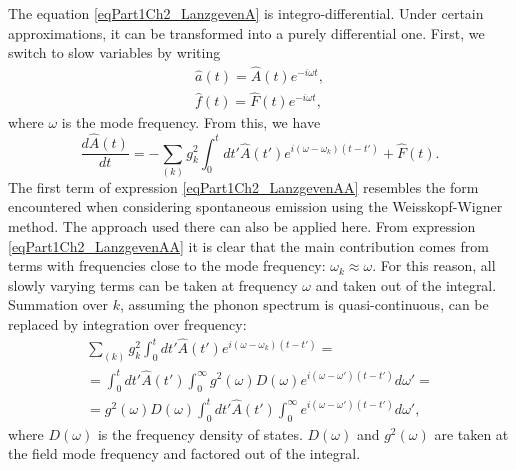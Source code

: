 The equation \eqref{eqPart1Ch2_LanzgevenA} is integro-differential. Under certain approximations, it can be transformed into a purely differential one. First, we switch to slow variables by writing
\begin{eqnarray}
\hat{a}\left(t\right) = \hat{A}\left(t\right)e^{-i \omega t},
\nonumber \\
\hat{f}\left(t\right) = \hat{F}\left(t\right)e^{-i \omega t},
\nonumber
\end{eqnarray}
where $\omega$ is the mode frequency. From this, we have
\begin{equation}
\frac{d \hat{A}\left(t\right)}{dt} = 
- \sum_{(k)} g_k^2 \int_0^t
d t'  \hat{A}\left(t'\right)e^{i \left(\omega -
  \omega_k\right)\left(t - t'\right)} 
+ \hat{F}\left(t\right).
\label{eqPart1Ch2_LanzgevenAA}
\end{equation}
The first term of expression \eqref{eqPart1Ch2_LanzgevenAA} resembles the form encountered when considering spontaneous emission using the Weisskopf-Wigner method. The approach used there can also be applied here. From expression \eqref{eqPart1Ch2_LanzgevenAA} it is clear that the main contribution comes from terms with frequencies close to the mode frequency: $\omega_k \approx \omega$. For this reason, all slowly varying terms can be taken at frequency $\omega$ and taken out of the integral. Summation over $k$, assuming the phonon spectrum is quasi-continuous, can be replaced by integration over frequency:
\begin{eqnarray}
\sum_{(k)}g_k^2\int_0^t d t' \hat{A}\left(t'\right) e^{i\left(\omega -
  \omega_k\right)\left(t - t'\right)} = 
\nonumber \\
=
\int_0^t d t'
  \hat{A}\left(t'\right)\int_0^{\infty}g^2\left(\omega\right) 
D\left(\omega\right) e^{i\left(\omega -
  \omega'\right)\left(t - t'\right)} d \omega' = 
\nonumber \\
= g^2\left(\omega\right) 
D\left(\omega\right)
\int_0^t d t'
  \hat{A}\left(t'\right)
\int_0^{\infty}e^{i\left(\omega -
  \omega'\right)\left(t - t'\right)} d \omega',
\nonumber
\end{eqnarray}
where $D\left(\omega\right)$ is the frequency density of states.
$D\left(\omega\right)$ and $g^2\left(\omega\right)$ are taken at the field mode frequency and factored out of the integral.

